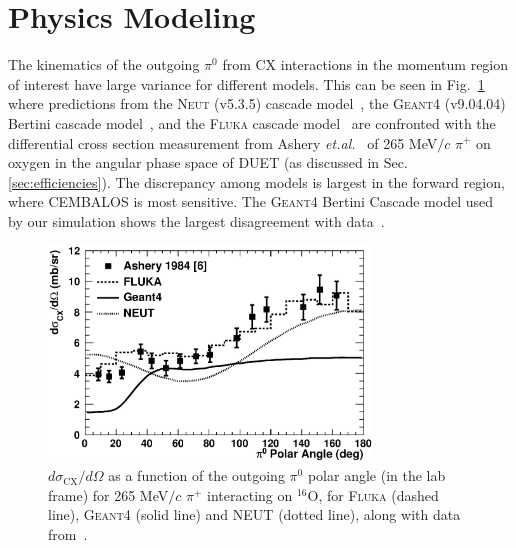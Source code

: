 \section{Physics Modeling}\label{sec:physics}
The kinematics of the outgoing $\pi^0$ from CX interactions in the momentum region of interest have large variance for different models. This can be seen in Fig.~\ref{fig:pi0kinem} where predictions from the \textsc{Neut} (v5.3.5) cascade model~\cite{NEUT}, the \textsc{Geant4} (v9.04.04) Bertini cascade model~\cite{bertini}, and the \textsc{Fluka} cascade model~\cite{fluka1,fluka2} are confronted with the differential cross section measurement from Ashery \textit{et.al.}~\cite{Ashery2} of 265 MeV$/c$ $\pi^{+}$ on oxygen in the angular phase space of DUET (as discussed in Sec. \ref{sec:efficiencies}). The discrepancy among models is largest in the forward region, where CEMBALOS is most sensitive. The \textsc{Geant4} Bertini Cascade model used by our simulation shows the largest disagreement with data~\cite{Ashery2}.

\begin{figure}[h]
 \includegraphics[width=86mm]{figures/dsigma_cx_o16_data_and_models.eps}
 \caption{$d\sigma_{\mathrm{CX}}/d\Omega$ as a function of the outgoing $\pi^0$ polar angle (in the lab frame) for 265 MeV$/c$ $\pi^{+}$ interacting on $^{16}$O, for \textsc{Fluka} (dashed line), \textsc{Geant4} (solid line) and \textsc{NEUT} (dotted line), along with data from~\cite{Ashery2}.}
 \label{fig:pi0kinem}
\end{figure}

